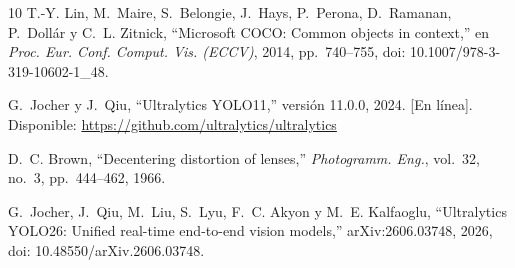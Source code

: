 \documentclass[conference]{IEEEtran}
\begin{document}
\begin{thebibliography}{10}
T.-Y. Lin, M.~Maire, S.~Belongie, J.~Hays, P.~Perona, D.~Ramanan, P.~Dollár y C.~L. Zitnick, ``Microsoft COCO: Common objects in context,'' en \emph{Proc. Eur. Conf. Comput. Vis. (ECCV)}, 2014, pp.~740--755, doi: 10.1007/978-3-319-10602-1\_48.

G.~Jocher y J.~Qiu, ``Ultralytics YOLO11,'' versión 11.0.0, 2024. [En línea]. Disponible: \url{https://github.com/ultralytics/ultralytics}

D.~C. Brown, ``Decentering distortion of lenses,'' \emph{Photogramm. Eng.}, vol.~32, no.~3, pp.~444--462, 1966.

G.~Jocher, J.~Qiu, M.~Liu, S.~Lyu, F.~C. Akyon y M.~E. Kalfaoglu, ``Ultralytics YOLO26: Unified real-time end-to-end vision models,'' arXiv:2606.03748, 2026, doi: 10.48550/arXiv.2606.03748.

\end{thebibliography}
\end{document}
